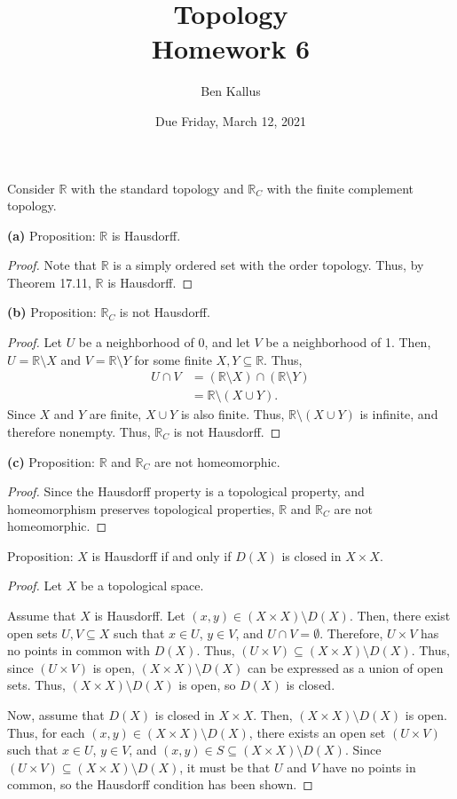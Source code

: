 \documentclass{article}
\date{Due Friday, March 12, 2021}
\author{Ben Kallus}
\title{Topology \\ Homework 6}
\newcommand{\R}{\mathbb R}
\begin{document}
\pagecolor{black}
\color{white}
\maketitle

 Consider $\R$ with the standard topology and $\R_C$ with the finite complement topology.

{\bf (a)} Proposition: $\R$ is Hausdorff.
\begin{proof}
    Note that $\R$ is a simply ordered set with the order topology.
    Thus, by Theorem 17.11, $\R$ is Hausdorff.
\end{proof}

{\bf (b)} Proposition: $\R_C$ is not Hausdorff.
\begin{proof}
    Let $U$ be a neighborhood of 0, and let $V$ be a neighborhood of 1.
    Then, $U= \R \setminus X$ and $V = \R \setminus Y$ for some finite $X,Y \subseteq \R$.
    Thus,
    \begin{align*}
        U \cap V &= (\R \setminus X) \cap (\R \setminus Y) \\
                 &= \R \setminus (X \cup Y).
    \end{align*}
    Since $X$ and $Y$ are finite, $X \cup Y$ is also finite.
    Thus, $\R \setminus (X \cup Y)$ is infinite, and therefore nonempty.
    Thus, $\R_C$ is not Hausdorff.
\end{proof}

{\bf (c)} Proposition: $\R$ and $\R_C$ are not homeomorphic.
\begin{proof}
    Since the Hausdorff property is a topological property, and homeomorphism preserves topological properties, $\R$ and $\R_C$ are not homeomorphic. %
\end{proof}

\newpage{} Proposition: $X$ is Hausdorff if and only if $D(X)$ is closed in $X \times X$.
\begin{proof}
    Let $X$ be a topological space.

    Assume that $X$ is Hausdorff.
    Let $(x,y) \in (X \times X) \setminus D(X)$.
    Then, there exist open sets $U,V \subseteq X$ such that $x \in U$, $y \in V$, and $U \cap V = \emptyset$.
    Therefore, $U \times V$ has no points in common with $D(X)$.
    Thus, $(U \times V) \subseteq (X \times X) \setminus D(X)$.
    Thus, since $(U \times V)$ is open, $(X \times X) \setminus D(X)$ can be expressed as a union of open sets.
    Thus, $(X \times X) \setminus D(X)$ is open, so $D(X)$ is closed.

    Now, assume that $D(X)$ is closed in $X \times X$.
    Then, $(X \times X) \setminus D(X)$ is open.
    Thus, for each $(x,y) \in (X \times X) \setminus D(X)$, there exists an open set $(U \times V)$ such that $x \in U$, $y \in V$, and $(x,y) \in S \subseteq (X \times X) \setminus D(X)$.
    Since $(U \times V) \subseteq (X \times X) \setminus D(X)$, it must be that $U$ and $V$ have no points in common, so the Hausdorff condition has been shown.
\end{proof}
\end{document}
